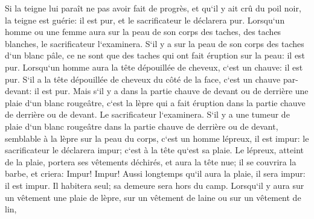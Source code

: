\verse Si la teigne lui paraît ne pas avoir fait de progrès, et qu`il y ait crû du poil noir, la teigne est guérie: il est pur, et le sacrificateur le déclarera pur. 
\verse Lorsqu`un homme ou une femme aura sur la peau de son corps des taches, des taches blanches, 
\verse le sacrificateur l`examinera. S`il y a sur la peau de son corps des taches d`un blanc pâle, ce ne sont que des taches qui ont fait éruption sur la peau: il est pur. 
\verse Lorsqu`un homme aura la tête dépouillée de cheveux, c`est un chauve: il est pur. 
\verse S`il a la tête dépouillée de cheveux du côté de la face, c`est un chauve par-devant: il est pur. 
\verse Mais s`il y a dans la partie chauve de devant ou de derrière une plaie d`un blanc rougeâtre, c`est la lèpre qui a fait éruption dans la partie chauve de derrière ou de devant. 
\verse Le sacrificateur l`examinera. S`il y a une tumeur de plaie d`un blanc rougeâtre dans la partie chauve de derrière ou de devant, semblable à la lèpre sur la peau du corps, 
\verse c`est un homme lépreux, il est impur: le sacrificateur le déclarera impur; c`est à la tête qu`est sa plaie. 
\verse Le lépreux, atteint de la plaie, portera ses vêtements déchirés, et aura la tête nue; il se couvrira la barbe, et criera: Impur! Impur! 
\verse Aussi longtemps qu`il aura la plaie, il sera impur: il est impur. Il habitera seul; sa demeure sera hors du camp. 
\verse Lorsqu`il y aura sur un vêtement une plaie de lèpre, sur un vêtement de laine ou sur un vêtement de lin, 
